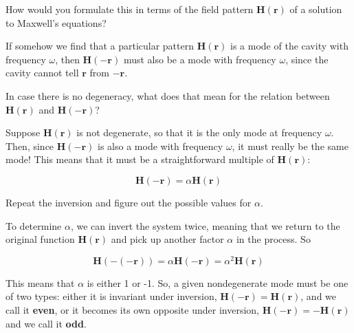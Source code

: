 \begin{cue}
How would you formulate this in terms of the field pattern ${\mathbf H({\mathbf r})}$ of a solution to Maxwell's equations?    
\end{cue}

If somehow we find that a particular pattern ${\mathbf H({\mathbf r})}$ is a mode of the cavity with frequency $\omega$, then ${\mathbf H(-{\mathbf r})}$ must also be a mode with frequency $\omega$, since the cavity cannot tell ${\mathbf r}$ from ${-\mathbf{r}}$.

\begin{cue}
In case there is no degeneracy, what does that mean for the relation between ${\mathbf H({\mathbf r})}$ and ${\mathbf H({\mathbf{-r}})}$?    
\end{cue}

Suppose ${\mathbf H({\mathbf r})}$ is not degenerate, so that it is the only mode at frequency $\omega$. Then, since ${\mathbf H(-{\mathbf{r}})}$ is also a mode with frequency $\omega$, it must really be the same mode! This means that it must be a straightforward multiple of ${\mathbf H({\mathbf r})}$:

\begin{equation}
{\mathbf H(-{\mathbf{r}})} = \alpha {\mathbf H({\mathbf r})}
\end{equation} 

\begin{cue}
Repeat the inversion and figure out the possible values for $\alpha$.    
\end{cue}

To determine $\alpha$, we can invert the system twice, meaning that we return to the original function ${\mathbf H({\mathbf r})}$ and pick up another factor $\alpha$ in the process. So

\begin{equation}
{\mathbf H(-(-{\mathbf{r}}))} = \alpha {\mathbf H(-{\mathbf r})} = \alpha^2 {\mathbf H({\mathbf r})}
\end{equation} 

\noindent{}This means that $\alpha$ is either 1 or -1. So, a given nondegenerate mode must be one of two types: either it is invariant under inversion, ${\mathbf H(-{\mathbf r})} = {\mathbf H({\mathbf r})}$, and we call it \textbf{even}, or it becomes its own opposite under inversion, ${\mathbf H(-{\mathbf r})} = - {\mathbf H({\mathbf r})}$ and we call it \textbf{odd}.

